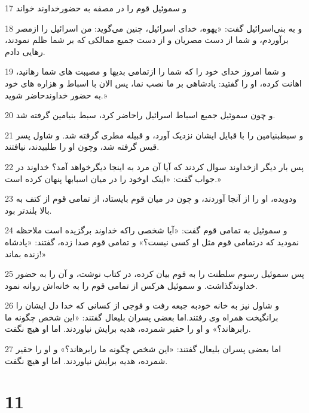 \par 17 و سموئیل قوم را در مصفه به حضورخداوند خواند
\par 18 و به بنی‌اسرائیل گفت: «یهوه، خدای اسرائیل، چنین می‌گوید: من اسرائیل را ازمصر برآوردم، و شما از دست مصریان و از دست جمیع ممالکی که بر شما ظلم نمودند، رهایی دادم.
\par 19 و شما امروز خدای خود را که شما را ازتمامی بدیها و مصیبت های شما رهانید، اهانت کرده، او را گفتید: پادشاهی بر ما نصب نما، پس الان با اسباط و هزاره های خود به حضور خداوندحاضر شوید.»
\par 20 و چون سموئیل جمیع اسباط اسرائیل راحاضر کرد، سبط بنیامین گرفته شد.
\par 21 و سبطبنیامین را با قبایل ایشان نزدیک آورد، و قبیله مطری گرفته شد. و شاول پسر قیس گرفته شد، وچون او را طلبیدند، نیافتند.
\par 22 پس بار دیگر ازخداوند سوال کردند که آیا آن مرد به اینجا دیگرخواهد آمد؟ خداوند در جواب گفت: «اینک اوخود را در میان اسبابها پنهان کرده است.»
\par 23 ودویده، او را از آنجا آوردند، و چون در میان قوم بایستاد، از تمامی قوم از کتف به بالا بلندتر بود.
\par 24 و سموئیل به تمامی قوم گفت: «آیا شخصی راکه خداوند برگزیده است ملاحظه نمودید که درتمامی قوم مثل او کسی نیست؟» و تمامی قوم صدا زده، گفتند: «پادشاه زنده بماند!»
\par 25 پس سموئیل رسوم سلطنت را به قوم بیان کرده، در کتاب نوشت، و آن را به حضور خداوندگذاشت. و سموئیل هرکس از تمامی قوم را به خانه‌اش روانه نمود.
\par 26 و شاول نیز به خانه خودبه جبعه رفت و فوجی از کسانی که خدا دل ایشان را برانگیخت همراه وی رفتند.اما بعضی پسران بلیعال گفتند: «این شخص چگونه ما رابرهاند؟» و او را حقیر شمرده، هدیه برایش نیاوردند. اما او هیچ نگفت.
\par 27 اما بعضی پسران بلیعال گفتند: «این شخص چگونه ما رابرهاند؟» و او را حقیر شمرده، هدیه برایش نیاوردند. اما او هیچ نگفت.
 
\chapter{11}

